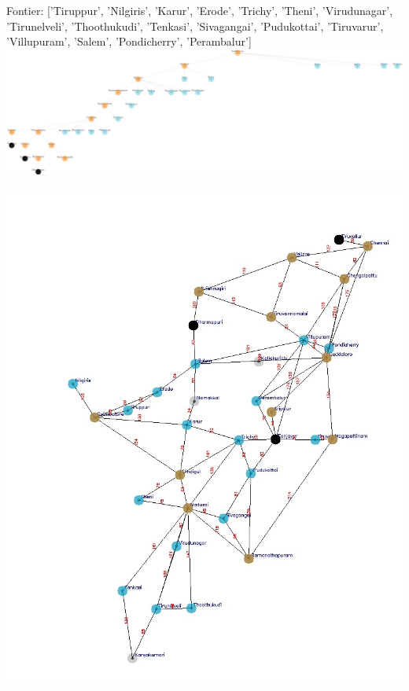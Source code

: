 \documentclass[xcolor=table]{beamer}
\begin{document}
\begin{frame}
  { \tiny Fontier: ['Tiruppur', 'Nilgiris', 'Karur', 'Erode', 'Trichy', 'Theni', 'Virudunagar', 'Tirunelveli', 'Thoothukudi', 'Tenkasi', 'Sivagangai', 'Pudukottai', 'Tiruvarur', 'Villupuram', 'Salem', 'Pondicherry', 'Perambalur']}
  \includegraphics[width=1\textwidth]{../DFSNodes/20-1.png}
  \begin{center}
    \includegraphics[height=0.45\textheight]{../DFSoutput/tamilDFS18.jpg}
  \end{center}
\end{frame}
\end{document}
